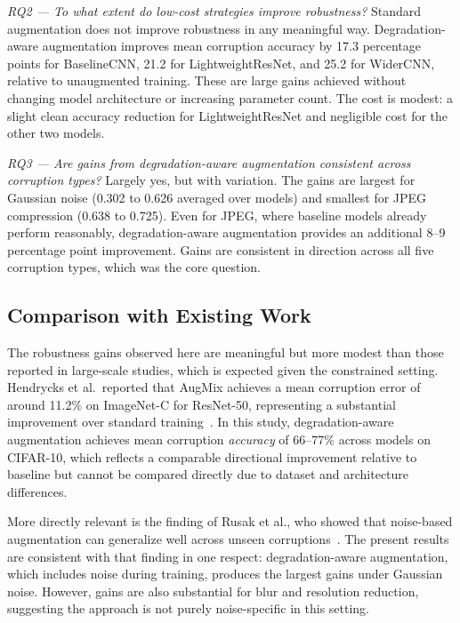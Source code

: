 \documentclass[conference]{IEEEtran}
\begin{document}
\textit{RQ2 --- To what extent do low-cost strategies improve robustness?} Standard augmentation does not improve robustness in any meaningful way. Degradation-aware augmentation improves mean corruption accuracy by 17.3 percentage points for BaselineCNN, 21.2 for LightweightResNet, and 25.2 for WiderCNN, relative to unaugmented training. These are large gains achieved without changing model architecture or increasing parameter count. The cost is modest: a slight clean accuracy reduction for LightweightResNet and negligible cost for the other two models.

\textit{RQ3 --- Are gains from degradation-aware augmentation consistent across corruption types?} Largely yes, but with variation. The gains are largest for Gaussian noise (0.302 to 0.626 averaged over models) and smallest for JPEG compression (0.638 to 0.725). Even for JPEG, where baseline models already perform reasonably, degradation-aware augmentation provides an additional 8--9 percentage point improvement. Gains are consistent in direction across all five corruption types, which was the core question.

\subsection{Comparison with Existing Work}

The robustness gains observed here are meaningful but more modest than those reported in large-scale studies, which is expected given the constrained setting. Hendrycks et al.\ reported that AugMix achieves a mean corruption error of around 11.2\% on ImageNet-C for ResNet-50, representing a substantial improvement over standard training~\cite{hendrycks2020}. In this study, degradation-aware augmentation achieves mean corruption \textit{accuracy} of 66--77\% across models on CIFAR-10, which reflects a comparable directional improvement relative to baseline but cannot be compared directly due to dataset and architecture differences.

More directly relevant is the finding of Rusak et al., who showed that noise-based augmentation can generalize well across unseen corruptions~\cite{rusak2020}. The present results are consistent with that finding in one respect: degradation-aware augmentation, which includes noise during training, produces the largest gains under Gaussian noise. However, gains are also substantial for blur and resolution reduction, suggesting the approach is not purely noise-specific in this setting.
\end{document}

